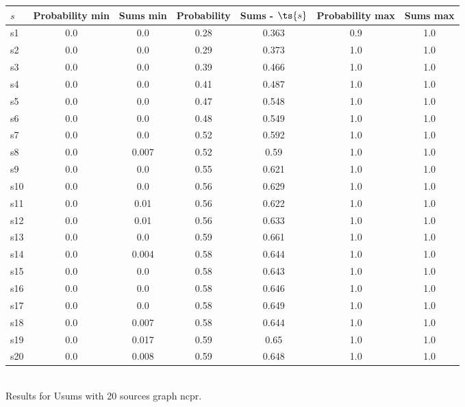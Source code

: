 \documentclass{article}
\begin{document}
\noindent\begin{tabular}{|l|c|c|c|c|c|c|}
\hline
$s$& Probability min & Sums min & Probability & Sums - $\ts{s}$ & Probability max & Sums max\\
\hline
s1 &0.0 & 0.0 & 0.28 & 0.363 & 0.9 & 1.0\\
\hline
s2 &0.0 & 0.0 & 0.29 & 0.373 & 1.0 & 1.0\\
\hline
s3 &0.0 & 0.0 & 0.39 & 0.466 & 1.0 & 1.0\\
\hline
s4 &0.0 & 0.0 & 0.41 & 0.487 & 1.0 & 1.0\\
\hline
s5 &0.0 & 0.0 & 0.47 & 0.548 & 1.0 & 1.0\\
\hline
s6 &0.0 & 0.0 & 0.48 & 0.549 & 1.0 & 1.0\\
\hline
s7 &0.0 & 0.0 & 0.52 & 0.592 & 1.0 & 1.0\\
\hline
s8 &0.0 & 0.007 & 0.52 & 0.59 & 1.0 & 1.0\\
\hline
s9 &0.0 & 0.0 & 0.55 & 0.621 & 1.0 & 1.0\\
\hline
s10 &0.0 & 0.0 & 0.56 & 0.629 & 1.0 & 1.0\\
\hline
s11 &0.0 & 0.01 & 0.56 & 0.622 & 1.0 & 1.0\\
\hline
s12 &0.0 & 0.01 & 0.56 & 0.633 & 1.0 & 1.0\\
\hline
s13 &0.0 & 0.0 & 0.59 & 0.661 & 1.0 & 1.0\\
\hline
s14 &0.0 & 0.004 & 0.58 & 0.644 & 1.0 & 1.0\\
\hline
s15 &0.0 & 0.0 & 0.58 & 0.643 & 1.0 & 1.0\\
\hline
s16 &0.0 & 0.0 & 0.58 & 0.646 & 1.0 & 1.0\\
\hline
s17 &0.0 & 0.0 & 0.58 & 0.649 & 1.0 & 1.0\\
\hline
s18 &0.0 & 0.007 & 0.58 & 0.644 & 1.0 & 1.0\\
\hline
s19 &0.0 & 0.017 & 0.59 & 0.65 & 1.0 & 1.0\\
\hline
s20 &0.0 & 0.008 & 0.59 & 0.648 & 1.0 & 1.0\\
\hline
\end{tabular}\\

\noindent Results for Usums with 20 sources graph ncpr.
\end{document}
